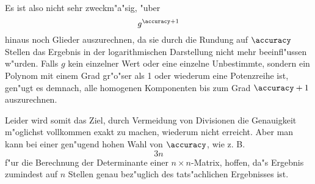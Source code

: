 Es ist also nicht sehr zweckm"a"sig, "uber \[ g^{\accuracy+1} \] hinaus
noch Glieder auszurechnen, da sie durch die Rundung auf $\accuracy$ Stellen
das Ergebnis in der logarithmischen Darstellung nicht mehr beeinfl"ussen
w"urden. Falls $g$ kein einzelner Wert oder eine einzelne Unbestimmte, 
sondern ein Polynom mit einem Grad gr"o"ser als 1 oder wiederum eine 
Potenzreihe ist, gen"ugt es demnach, alle homogenen Komponenten bis zum
Grad $\accuracy+1$ auszurechnen.

Leider wird somit das Ziel, durch Vermeidung von Divisionen die
Genauigkeit m"oglichst vollkommen exakt zu machen, wiederum nicht erreicht.
Aber man kann bei einer gen"ugend hohen Wahl von $\accuracy$, wie z. B.
\[ 3n \] f"ur die Berechnung der Determinante einer $n \times n$-Matrix,
hoffen, da"s Ergebnis zumindest auf $n$ Stellen genau bez"uglich des
tats"achlichen Ergebnisses ist.


